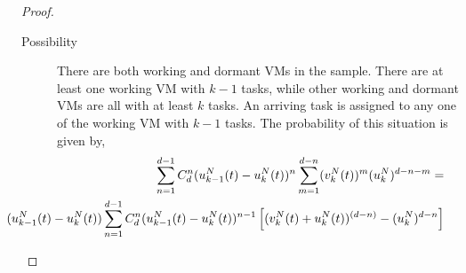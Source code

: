 \documentclass[12pt]{article}
\begin{document}
\begin{proof}
\begin{description}
\begin{description}
\begin{description}
                    \item[Possibility \uppercase\expandafter{}] There are both working and dormant VMs in the sample. There are at least one working VM with $k-1$ tasks, while other working and dormant VMs are all with at least $k$ tasks. An arriving task is assigned to any one of the working VM with $k-1$ tasks. The probability of this situation is given by,
                            \begin{eqnarray}
                                \nonumber&&\displaystyle\sum\limits_{n=1}\limits^{d-1}C^{n}_{d}(u_{k-1}^{N}(t)-u_{k}^{N}(t))^{n}
                                \sum\limits_{m=1}\limits^{d-n}(v_k^N(t))^m(u_{k}^{N})^{d-n-m}  = \\
                                 && \hspace*{-2.5cm} (u_{k-1}^{N}(t)-u_{k}^{N}(t)) \displaystyle\sum\limits_{n=1}\limits^{d-1}C^{n}_{d}(u_{k-1}^{N}(t)-u_{k}^{N}(t))^{n-1}
                                        \left[(v_k^N(t)+u_k^N(t))^{(d-n)}-(u_{k}^{N})^{d-n}\right]
                            \end{eqnarray}


\end{description}
\end{description}
\end{description}
\end{proof}
\end{document}
